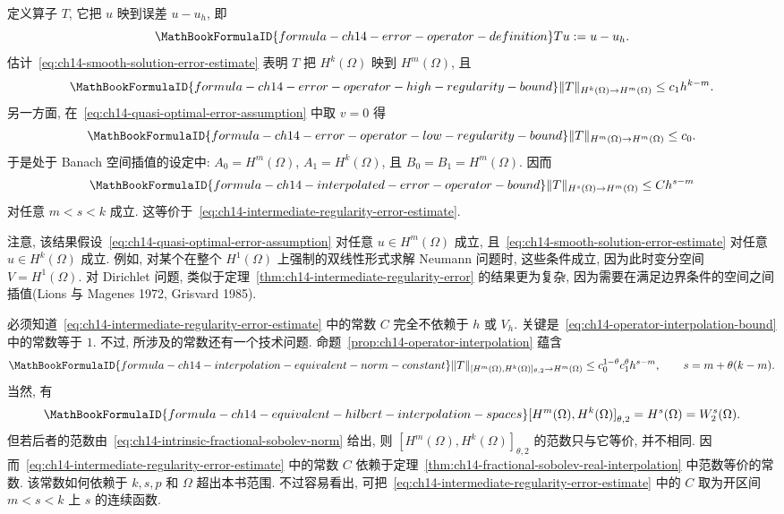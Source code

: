 \begin{Proof}
定义算子 $T$, 它把 $u$ 映到误差 $u-u_h$, 即
\[
\MathBookFormulaID{formula-ch14-error-operator-definition}
Tu:=u-u_h.
\]
估计~\eqref{eq:ch14-smooth-solution-error-estimate} 表明 $T$ 把 $H^k(\Omega)$ 映到 $H^m(\Omega)$, 且
\[
\MathBookFormulaID{formula-ch14-error-operator-high-regularity-bound}
\|T\|_{H^k(\Omega)\to H^m(\Omega)}\leq c_1h^{k-m}.
\]
另一方面, 在~\eqref{eq:ch14-quasi-optimal-error-assumption} 中取 $v=0$ 得
\[
\MathBookFormulaID{formula-ch14-error-operator-low-regularity-bound}
\|T\|_{H^m(\Omega)\to H^m(\Omega)}\leq c_0.
\]
于是处于 Banach 空间插值的设定中: $A_0=H^m(\Omega)$, $A_1=H^k(\Omega)$, 且 $B_0=B_1=H^m(\Omega)$. 因而
\[
\MathBookFormulaID{formula-ch14-interpolated-error-operator-bound}
\|T\|_{H^s(\Omega)\to H^m(\Omega)}\leq Ch^{s-m}
\]
对任意 $m<s<k$ 成立. 这等价于~\eqref{eq:ch14-intermediate-regularity-error-estimate}.
\end{Proof}

注意, 该结果假设~\eqref{eq:ch14-quasi-optimal-error-assumption} 对任意 $u\in H^m(\Omega)$ 成立, 且~\eqref{eq:ch14-smooth-solution-error-estimate} 对任意 $u\in H^k(\Omega)$ 成立. 例如, 对某个在整个 $H^1(\Omega)$ 上强制的双线性形式求解 Neumann 问题时, 这些条件成立, 因为此时变分空间 $V=H^1(\Omega)$. 对 Dirichlet 问题, 类似于定理~\ref{thm:ch14-intermediate-regularity-error} 的结果更为复杂, 因为需要在满足边界条件的空间之间插值(Lions 与 Magenes 1972, Grisvard 1985).

必须知道~\eqref{eq:ch14-intermediate-regularity-error-estimate} 中的常数 $C$ 完全不依赖于 $h$ 或 $V_h$. 关键是~\eqref{eq:ch14-operator-interpolation-bound} 中的常数等于 $1$. 不过, 所涉及的常数还有一个技术问题. 命题~\ref{prop:ch14-operator-interpolation} 蕴含
\[
\MathBookFormulaID{formula-ch14-interpolation-equivalent-norm-constant}
\|T\|_{[H^m(\Omega),H^k(\Omega)]_{\theta,2}\to H^m(\Omega)}
\leq c_0^{1-\theta}c_1^\theta h^{s-m},
\qquad s=m+\theta(k-m).
\]
当然, 有
\[
\MathBookFormulaID{formula-ch14-equivalent-hilbert-interpolation-spaces}
[H^m(\Omega),H^k(\Omega)]_{\theta,2}=H^s(\Omega)=W_2^s(\Omega).
\]
但若后者的范数由~\eqref{eq:ch14-intrinsic-fractional-sobolev-norm} 给出, 则 $[H^m(\Omega),H^k(\Omega)]_{\theta,2}$ 的范数只与它等价, 并不相同. 因而~\eqref{eq:ch14-intermediate-regularity-error-estimate} 中的常数 $C$ 依赖于定理~\ref{thm:ch14-fractional-sobolev-real-interpolation} 中范数等价的常数. 该常数如何依赖于 $k,s,p$ 和 $\Omega$ 超出本书范围. 不过容易看出, 可把~\eqref{eq:ch14-intermediate-regularity-error-estimate} 中的 $C$ 取为开区间 $m<s<k$ 上 $s$ 的连续函数.

